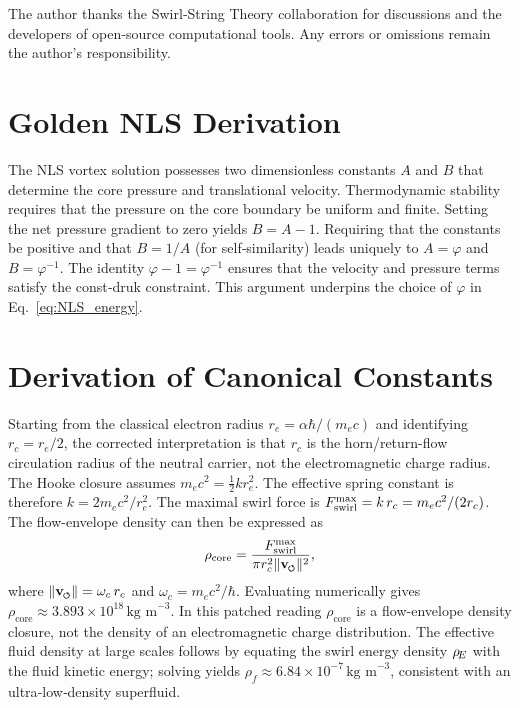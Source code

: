 \documentclass[11pt]{article}
\newcommand{\vnorm}{\lVert \mathbf{v}_{\mkern-2mu\scriptscriptstyle\boldsymbol{\circlearrowleft}} \rVert}  %
\newcommand{\rhoF}{\rho_{\!f}}\newcommand{\rhof}{\rho_{\!f}}     %
\newcommand{\rc}{r_c}                                    %
\newcommand{\rhocore}{\rho_{\text{core}}}
\newcommand{\phiG}{\varphi}
\newcommand{\me}{m_e}
\begin{document}
The author thanks the Swirl‑String Theory collaboration for discussions and the developers of open‑source computational tools.  Any errors or omissions remain the author's responsibility.

\appendix

\section{Golden NLS Derivation}
\label{app:golden}

The NLS vortex solution possesses two dimensionless constants $A$ and $B$ that determine the core pressure and translational velocity.  Thermodynamic stability requires that the pressure on the core boundary be uniform and finite.  Setting the net pressure gradient to zero yields $B = A - 1$.  Requiring that the constants be positive and that $B = 1/A$ (for self‑similarity) leads uniquely to $A = \phiG$ and $B = \phiG^{-1}$.  The identity $\phiG - 1 = \phiG^{-1}$ ensures that the velocity and pressure terms satisfy the const‑druk constraint.  This argument underpins the choice of $\phiG$ in Eq.~\eqref{eq:NLS_energy}.

\section{Derivation of Canonical Constants}
\label{app:constants}

Starting from the classical electron radius $r_e = \alpha\hbar/(\me c)$ and identifying $\rc = r_e/2$, the corrected interpretation is that $\rc$ is the horn/return-flow circulation radius of the neutral carrier, not the electromagnetic charge radius.  The Hooke closure assumes $m_e c^2 = \tfrac{1}{2} k r_e^2$.  The effective spring constant is therefore $k = 2 m_e c^2/r_e^2$.  The maximal swirl force is $F_{\rm swirl}^{\max} = k\,\rc = m_e c^2/(2\rc)$.  The flow-envelope density can then be expressed as
\begin{equation}
    \rhocore = \frac{F_\textrm{swirl}^{\max}}{\pi \rc^2 \vnorm^2},
    \label{eq:equation}
\end{equation}
where $\vnorm = \omega_c\,\rc$ and $\omega_c = m_e c^2/\hbar$.  Evaluating numerically gives $\rhocore \approx 3.893\times 10^{18}\,\text{kg m}^{-3}$.  In this patched reading $\rhocore$ is a flow-envelope density closure, not the density of an electromagnetic charge distribution.  The effective fluid density at large scales follows by equating the swirl energy density $\rho_{\!E}$ with the fluid kinetic energy; solving yields $\rhoF \approx 6.84\times 10^{-7}\,\text{kg m}^{-3}$, consistent with an ultra‑low‑density superfluid.
\end{document}
